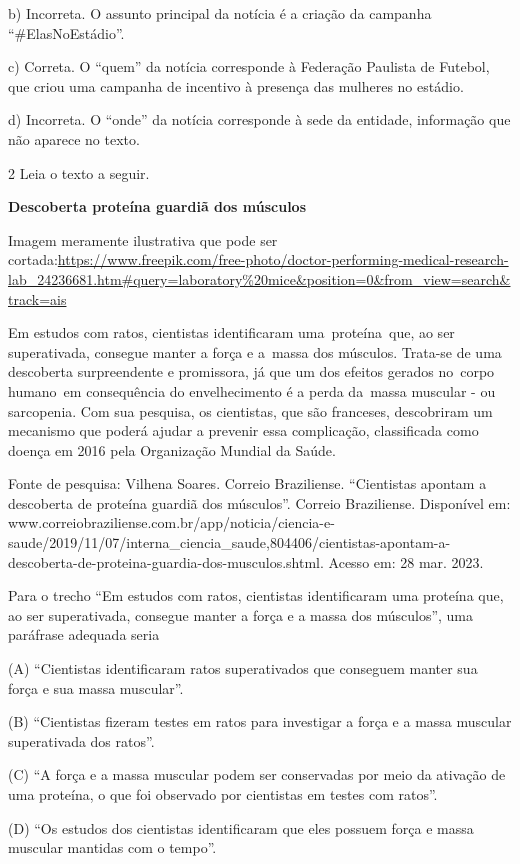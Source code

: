 \begin{itemize}
\begin{itemize}
{\begin{itemize}
b) Incorreta. O assunto principal da notícia é a criação da campanha
``\#ElasNoEstádio''.

c) Correta. O ``quem'' da notícia corresponde à Federação Paulista de
Futebol, que criou uma campanha de incentivo à presença das mulheres no
estádio.

d) Incorreta. O ``onde'' da notícia corresponde à sede da entidade,
informação que não aparece no texto.

\num{2} Leia o texto a seguir.

\textbf{Descoberta proteína guardiã dos músculos}

Imagem meramente ilustrativa que pode ser
cortada:\url{https://www.freepik.com/free-photo/doctor-performing-medical-research-lab_24236681.htm\#query=laboratory\%20mice\&position=0\&from_view=search\&track=ais}

Em estudos com ratos, cientistas identificaram uma~proteína~que, ao ser
superativada, consegue manter a força e a~massa dos músculos. Trata-se
de uma descoberta surpreendente e promissora, já que um dos efeitos
gerados no~corpo humano~em consequência do envelhecimento é a perda
da~massa muscular - ou sarcopenia. Com sua pesquisa, os cientistas, que
são franceses, descobriram um mecanismo que poderá ajudar a prevenir
essa complicação, classificada como doença em 2016 pela Organização
Mundial da Saúde.

Fonte de pesquisa: Vilhena Soares. Correio Braziliense. ``Cientistas
apontam a descoberta de proteína guardiã dos músculos''. Correio
Braziliense. Disponível em:
www.correiobraziliense.com.br/app/noticia/ciencia-e-saude/2019/11/07/interna\_ciencia\_saude,804406/cientistas-apontam-a-descoberta-de-proteina-guardia-dos-musculos.shtml.
Acesso em: 28 mar. 2023.

Para o trecho ``Em estudos com ratos, cientistas identificaram uma
proteína que, ao ser superativada, consegue manter a força e a massa dos
músculos'', uma paráfrase adequada seria

(A) ``Cientistas identificaram ratos superativados que conseguem manter
sua força e sua massa muscular''.

(B) ``Cientistas fizeram testes em ratos para investigar a força e a
massa muscular superativada dos ratos''.

(C) ``A força e a massa muscular podem ser conservadas por meio da
ativação de uma proteína, o que foi observado por cientistas em testes
com ratos''.

(D) ``Os estudos dos cientistas identificaram que eles possuem força e
massa muscular mantidas com o tempo''.


\end{itemize}}
\end{itemize}
\end{itemize}
